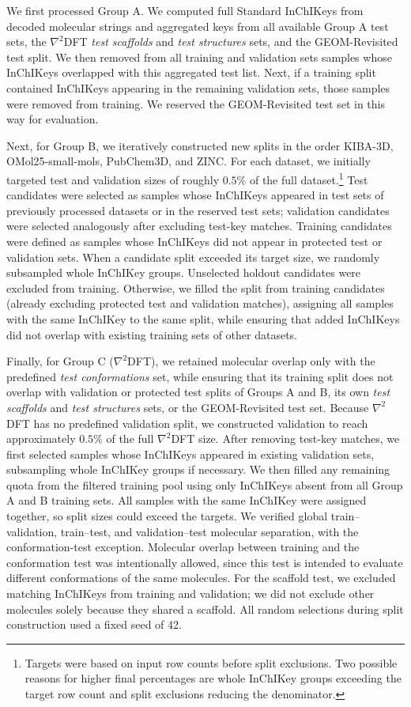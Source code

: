 We first processed Group A. We computed full Standard InChIKeys from decoded molecular strings and aggregated keys from all available Group A test sets, the $\nabla^2$DFT \emph{test scaffolds} and \emph{test structures} sets, and the GEOM-Revisited test split. We then removed from all training and validation sets samples whose InChIKeys overlapped with this aggregated test list. Next, if a training split contained InChIKeys appearing in the remaining validation sets, those samples were removed from training. We reserved the GEOM-Revisited test set in this way for evaluation.

Next, for Group B, we iteratively constructed new splits in the order KIBA-3D, OMol25-small-mols, PubChem3D, and ZINC. For each dataset, we initially targeted test and validation sizes of roughly $0.5\%$ of the full dataset.\footnote{Targets were based on input row counts before split exclusions. Two possible reasons for higher final percentages are whole InChIKey groups exceeding the target row count and split exclusions reducing the denominator.} Test candidates were selected as samples whose InChIKeys appeared in test sets of previously processed datasets or in the reserved test sets; validation candidates were selected analogously after excluding test-key matches. Training candidates were defined as samples whose InChIKeys did not appear in protected test or validation sets. When a candidate split exceeded its target size, we randomly subsampled whole InChIKey groups. Unselected holdout candidates were excluded from training. Otherwise, we filled the split from training candidates (already excluding protected test and validation matches), assigning all samples with the same InChIKey to the same split, while ensuring that added InChIKeys did not overlap with existing training sets of other datasets.

Finally, for Group C ($\nabla^2$DFT), we retained molecular overlap only with the predefined \emph{test conformations} set, while ensuring that its training split does not overlap with validation or protected test splits of Groups A and B, its own \emph{test scaffolds} and \emph{test structures} sets, or the GEOM-Revisited test set. Because $\nabla^2$DFT has no predefined validation split, we constructed validation to reach approximately $0.5\%$ of the full $\nabla^2$DFT size. After removing test-key matches, we first selected samples whose InChIKeys appeared in existing validation sets, subsampling whole InChIKey groups if necessary. We then filled any remaining quota from the filtered training pool using only InChIKeys absent from all Group A and B training sets. All samples with the same InChIKey were assigned together, so split sizes could exceed the targets. We verified global train--validation, train--test, and validation--test molecular separation, with the conformation-test exception. Molecular overlap between training and the conformation test was intentionally allowed, since this test is intended to evaluate different conformations of the same molecules. For the scaffold test, we excluded matching InChIKeys from training and validation; we did not exclude other molecules solely because they shared a scaffold. All random selections during split construction used a fixed seed of 42.

